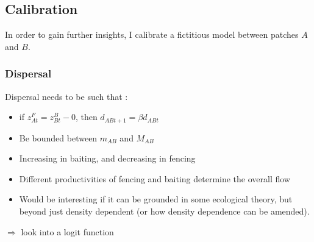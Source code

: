 \documentclass{article}
\begin{document}
\subsection{Calibration}
In order to gain further insights, I calibrate a fictitious model between patches $A$ and $B$. 



\subsubsection{Dispersal}
Dispersal needs to be such that : 
\begin{itemize}
\item if $z_{At}^F = z_{Bt}^B - 0$, then $d_{ABt+1}=\beta d_{ABt}$
\item Be bounded between $m_{AB}$ and $M_{AB}$
\item Increasing in baiting, and decreasing in fencing
\item Different productivities of fencing and baiting determine the overall flow

\item Would be interesting if it can be grounded in some ecological theory, but beyond just density dependent (or how density dependence can be amended).
\end{itemize}
$\Rightarrow$ look into a logit function
\end{document}
